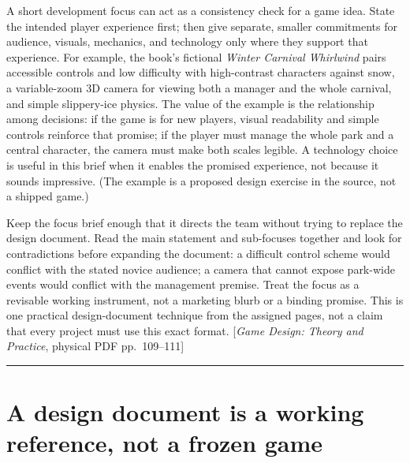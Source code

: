 \hypertarget{06-engine-ii-ch046-write-a-development-focus-that-can-expose-contradictions-early}{}

A short development focus can act as a consistency check for a game idea. State the intended player experience first; then give separate, smaller commitments for audience, visuals, mechanics, and technology only where they support that experience. For example, the book's fictional \emph{Winter Carnival Whirlwind} pairs accessible controls and low difficulty with high-contrast characters against snow, a variable-zoom 3D camera for viewing both a manager and the whole carnival, and simple slippery-ice physics. The value of the example is the relationship among decisions: if the game is for new players, visual readability and simple controls reinforce that promise; if the player must manage the whole park and a central character, the camera must make both scales legible. A technology choice is useful in this brief when it enables the promised experience, not because it sounds impressive. (The example is a proposed design exercise in the source, not a shipped game.)

Keep the focus brief enough that it directs the team without trying to replace the design document. Read the main statement and sub-focuses together and look for contradictions before expanding the document: a difficult control scheme would conflict with the stated novice audience; a camera that cannot expose park-wide events would conflict with the management premise. Treat the focus as a revisable working instrument, not a marketing blurb or a binding promise. This is one practical design-document technique from the assigned pages, not a claim that every project must use this exact format. {[}\emph{Game Design: Theory and Practice}, physical PDF pp.~109--111{]}

\begin{center}\rule{0.5\linewidth}{0.5pt}\end{center}

\section{A design document is a working reference, not a frozen game}\label{06-engine-ii-ch046-a-design-document-is-a-working-reference-not-a-frozen-game}

\hypertarget{06-engine-ii-ch046-a-design-document-is-a-working-reference-not-a-frozen-game}{}

